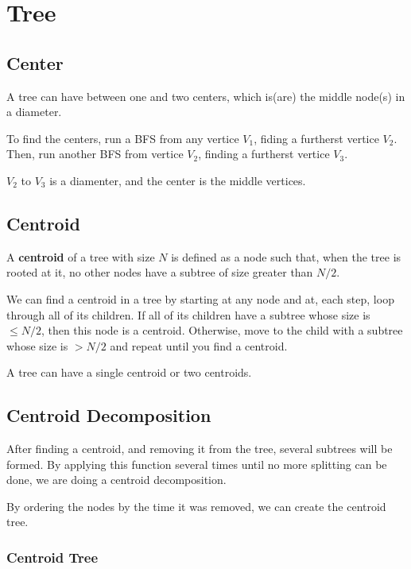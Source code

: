 \chapter{Tree}

\section{Center}

A tree can have between one and two centers, which is(are) the middle node(s) in a diameter.

To find the centers, run a BFS from any vertice $V_1$, fiding a furtherst vertice $V_2$. 
Then, run another BFS from vertice $V_2$, finding a furtherst vertice $V_3$. 

$V_2$ to $V_3$ is a diamenter, and the center is the middle vertices.

\section{Centroid}

A \textbf{centroid} of a tree with size $N$ is defined as a node such that, when the tree is rooted
at it, no other nodes have a subtree of size greater than $N/2$.

We can find a centroid in a tree by starting at any node and at, each step, 
loop through all of its children. 
If all of its children have a subtree whose size is $ \leq N/2$, then this node is a centroid. 
Otherwise, move to the child with a subtree whose size is $> N/2$ 
and repeat until you find a centroid.

A tree can have a single centroid or two centroids.


\section{Centroid Decomposition}

After finding a centroid, and removing it from the tree, several subtrees will be formed.
By applying this function several times until no more splitting can be done,
we are doing a centroid decomposition. 

By ordering the nodes by the time it was removed, we can create the centroid tree.

\subsection{Centroid Tree}

